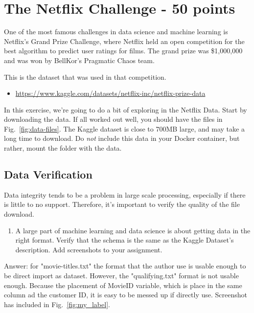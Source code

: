 \documentclass[paper=a4, fontsize=11pt]{scrartcl} %
\begin{document}
\section{The Netflix Challenge - 50 points}

One of the most famous challenges in data science and machine learning is Netflix's Grand Prize Challenge, where Netflix held an open competition for the best algorithm to predict user ratings for films. The grand prize was \$1,000,000 and was won by BellKor's Pragmatic Chaos team. 

This is the dataset that was used in that competition.
\begin{itemize}
    \item \url{https://www.kaggle.com/datasets/netflix-inc/netflix-prize-data}
\end{itemize}

In this exercise, we're going to do a bit of exploring in the Netflix Data. Start by downloading the data. If all worked out well, you should have the files in Fig.~\ref{fig:data-files}. The Kaggle dataset is close to 700MB large, and may take a long time to download. Do \emph{not} include this data in your Docker container, but rather, mount the folder with the data.

\subsection{Data Verification}

Data integrity tends to be a problem in large scale processing, especially if there is little to no support. Therefore, it's important to verify the quality of the file download. 

\noindent
\begin{enumerate}
\item A large part of machine learning and data science is about getting data in the right format. Verify that the schema is the same as the Kaggle Dataset's description. Add screenshots to your assignment.
\end{enumerate}

Answer: for "movie-titles.txt" the format that the author use is usable enough to be direct import as dataset. However, the "qualifying.txt" format is not usable enough. Because the placement of MovieID variable, which is place in the same column ad the customer ID, it is easy to be messed up if directly use. Screenshot has included in Fig.~\ref{fig:my_label}.
\end{document}
